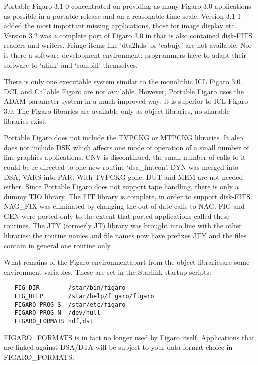    Portable Figaro 3.1-0 concentrated on providing as many Figaro 3.0
   applications as possible in a portable release and on a reasonable
   time scale.  Version 3.1-1 added the most important missing
   applications, those for image display etc.  Version 3.2 was a complete
   port of Figaro 3.0 in that is also contained disk-FITS readers and
   writers.  Fringe items like `dta2hds' or `cabujy' are not available.
   Nor is there a software development environment; programmers have to
   adapt their software to `alink' and `compifl' themselves.

   There is only one executable system similar to the monolithic ICL
   Figaro 3.0. DCL and Callable Figaro are not available.  However,
   Portable Figaro uses the ADAM parameter system in a much improved
   way; it is superior to ICL Figaro 3.0. The Figaro libraries are
   available only as object libraries, no sharable libraries exist.

   Portable Figaro does not include the TVPCKG or MTPCKG libraries.  It also
   does not include DSK which affects one mode of operation of a small
   number of line graphics applications. CNV is discontinued, the small
   number of calls to it could be re-directed to one new routine
   `dsa\_fmtcon'. DYN was merged into DSA, VARS into PAR. With TVPCKG gone,
   DUT and MEM are not needed either.  Since Portable Figaro does not
   support tape handling, there is only a dummy TIO library. The FIT
   library is complete, in order to support disk-FITS.  NAG\_FIX was
   eliminated by changing the out-of-date calls to NAG. FIG and GEN were
   ported only to the extent that ported applications called these
   routines. The JTY (formerly JT) library was brought into line with
   the other libraries: the routine names and file names now have
   prefixes JTY and the files contain in general one routine only.

   What remains of the Figaro environment\latorhtm{---}{-}apart from the
   object libraries\latorhtm{---}{-}are some environment variables. These
   are set in the Starlink startup scripts:

\begin{verbatim}
   FIG_DIR        /star/bin/figaro
   FIG_HELP       /star/help/figaro/figaro
   FIGARO_PROG_S  /star/etc/figaro
   FIGARO_PROG_N  /dev/null
   FIGARO_FORMATS ndf,dst
\end{verbatim}

   FIGARO\_FORMATS is in fact no longer used by Figaro itself.
   Applications that are linked against DSA/DTA will be subject to
   your data format choice in FIGARO\_FORMATS.

